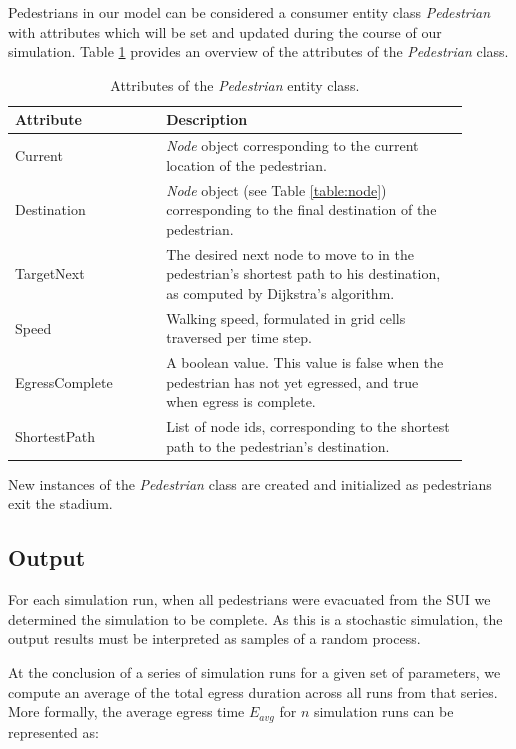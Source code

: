 \documentclass[12pt]{article}
\begin{document}
Pedestrians in our model can be considered a consumer entity class
\textit{Pedestrian} with attributes which will be set and updated during the
course of our simulation. Table \ref{table:ped} provides an overview of the
attributes of the \textit{Pedestrian} class.

\def\arraystretch{1.5}
\begin{table}[hb!]
  \centering
    \begin{tabular}{p{0.3\linewidth}p{0.6\linewidth}}
     \hline
     Attribute & Description \\
     \hline
     Current        & \textit{Node} object corresponding to the current
                      location of the pedestrian. \\
     Destination    & \textit{Node} object (see Table \ref{table:node})
                      corresponding to the final destination of the
                      pedestrian. \\
     TargetNext     & The desired next node to move to in the pedestrian's
                      shortest path to his destination, as computed by
                      Dijkstra's algorithm. \\
     Speed          & Walking speed, formulated in grid cells traversed per
                      time step. \\
     EgressComplete & A boolean value. This value is false when the pedestrian
                      has not yet egressed, and true when egress is complete. \\
     ShortestPath & List of node ids, corresponding to the shortest path to the
                    pedestrian's destination. \\
     \hline
    \end{tabular}
    \caption{Attributes of the \textit{Pedestrian} entity class.}
  \label{table:ped}
\end{table}

New instances of the \textit{Pedestrian} class are created and initialized
as pedestrians exit the stadium.

\subsection{Output}
For each simulation run, when all pedestrians were evacuated from the SUI we
determined the simulation to be complete. As this is a stochastic simulation,
the output results must be interpreted as samples of a random process.

At the conclusion of a series of simulation runs for a given set of parameters,
we compute an average of the total egress duration across all runs from that
series. More formally, the average egress time $E_{avg}$ for $n$ simulation runs
can be represented as:
\end{document}
